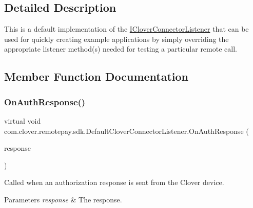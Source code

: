 \subsection{Detailed Description}
This is a default implementation of the \hyperlink{interfacecom_1_1clover_1_1remotepay_1_1sdk_1_1_i_clover_connector_listener}{I\+Clover\+Connector\+Listener} that can be used for quickly creating example applications by simply overriding the appropriate listener method(s) needed for testing a particular remote call. 



\subsection{Member Function Documentation}
\mbox{\label{classcom_1_1clover_1_1remotepay_1_1sdk_1_1_default_clover_connector_listener_afbe9b03563cc7129384a094eae1adbe5}} 
\subsubsection{\texorpdfstring{On\+Auth\+Response()}{OnAuthResponse()}}
{\footnotesize\ttfamily virtual void com.\+clover.\+remotepay.\+sdk.\+Default\+Clover\+Connector\+Listener.\+On\+Auth\+Response (\begin{DoxyParamCaption}\item[{\hyperlink{classcom_1_1clover_1_1remotepay_1_1sdk_1_1_auth_response}{Auth\+Response}}]{response }\end{DoxyParamCaption})\hspace{0.3cm}{\ttfamily [virtual]}}



Called when an authorization response is sent from the Clover device. 


\begin{DoxyParams}{Parameters}
{\em response} & The response.\\
\hline
\end{DoxyParams}


